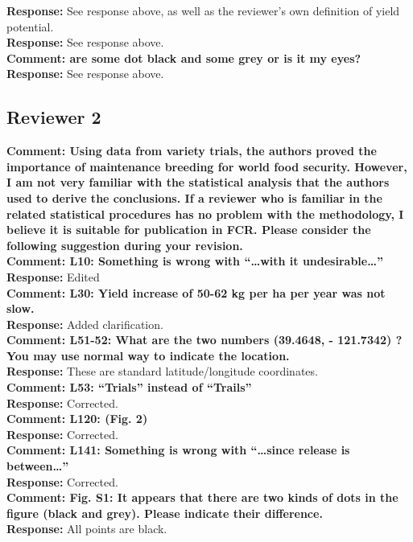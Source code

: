 \documentclass{article} \usepackage[margin=1in]{geometry}
\begin{document}
\textbf{Response: } See response above, as well as the reviewer's own
definition of yield potential.\\

\textbf{Response: } See response above.\\

\textbf{Comment: are some dot black and some grey or is it my eyes?}\\

\textbf{Response: } See response above.\\

\subsection{Reviewer 2}

\textbf{Comment: Using data from variety trials, the authors proved
  the importance of maintenance breeding for world food
  security. However, I am not very familiar with the statistical
  analysis that the authors used to derive the conclusions. If a
  reviewer who is familiar in the related statistical procedures has
  no problem with the methodology, I believe it is suitable for
  publication in FCR. Please consider the following suggestion during
  your revision.}\\


\textbf{Comment: L10: Something is wrong with “…with it
  undesirable…”}\\

\textbf{Response:} Edited\\

\textbf{Comment: L30: Yield increase of 50-62 kg per ha per year was
  not slow.}\\

\textbf{Response:} Added clarification.\\

\textbf{Comment: L51-52: What are the two numbers (39.4648, -
  121.7342) ? You may use normal way to indicate the location.}\\

\textbf{Response:} These are standard latitude/longitude
coordinates.\\

\textbf{Comment: L53: “Trials” instead of “Trails”}\\

\textbf{Response:} Corrected.\\

\textbf{Comment: L120: (Fig. 2)}\\

\textbf{Response:} Corrected.\\

\textbf{Comment: L141: Something is wrong with “…since release is
  between…”}\\

\textbf{Response:} Corrected.\\

\textbf{Comment: Fig. S1: It appears that there are two kinds of dots
  in the figure (black and grey). Please indicate their difference.}\\

\textbf{Response:} All points are black.\\
\end{document}
